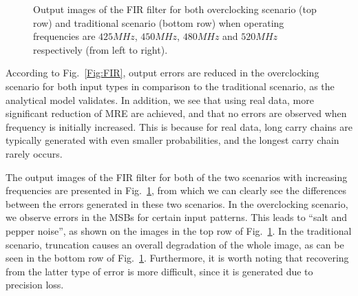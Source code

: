 \documentclass[prodmode,acmtrets]{acmsmall} %
\begin{document}
\begin{figure}[ht]
{  }%
\caption{Output images of the FIR filter for both overclocking scenario (top row) and traditional scenario (bottom row) when operating frequencies are $425MHz$, $450MHz$, $480MHz$ and $520MHz$ respectively (from left to right).}
\label{Fig:FIR_Lena}
\end{figure}

According to Fig.~\ref{Fig:FIR}, output errors are reduced in the overclocking scenario for both input types in comparison to the traditional scenario, as the analytical model validates. In addition, we see that using real data, more significant reduction of MRE are achieved, and that no errors are observed when frequency is initially increased. This is because for real data, long carry chains are typically generated with even smaller probabilities, and the longest carry chain rarely occurs.

The output images of the FIR filter for both of the two scenarios with increasing frequencies are presented in Fig.~\ref{Fig:FIR_Lena}, from which we can clearly see the differences between the errors generated in these two scenarios. In the overclocking scenario, we observe errors in the MSBs for certain input patterns. This leads to ``salt and pepper noise'', as shown on the images in the top row of Fig.~\ref{Fig:FIR_Lena}. In the traditional scenario, truncation causes an overall degradation of the whole image, as can be seen in the bottom row of Fig.~\ref{Fig:FIR_Lena}. Furthermore, it is worth noting that recovering from the latter type of error is more difficult, since it is generated due to precision loss.
\end{document}
